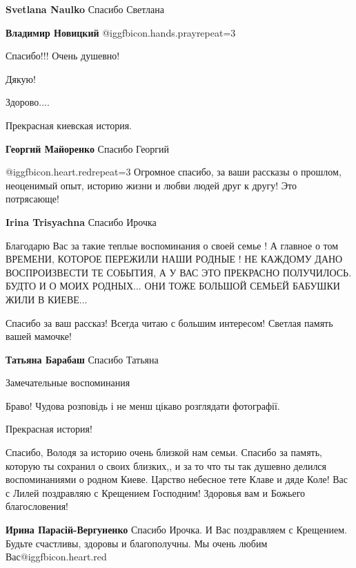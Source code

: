 \begin{itemize}
\begin{itemize} %
\textbf{Svetlana Naulko} Спасибо Светлана

\textbf{Владимир Новицкий}  @igg{fbicon.hands.pray}{repeat=3} 
\end{itemize} %

Спасибо!!!
Очень душевно!

Дякую!

Здорово....

Прекрасная киевская история.

\textbf{Георгий Майоренко} Спасибо Георгий

@igg{fbicon.heart.red}{repeat=3} Огромное спасибо, за ваши рассказы о прошлом, неоценимый опыт, историю жизни и любви людей друг к другу! Это потрясающе!

\textbf{Irina Trisyachna} Спасибо Ирочка


Благодарю Вас за такие теплые воспоминания о своей семье ! А главное о том
ВРЕМЕНИ, КОТОРОЕ ПЕРЕЖИЛИ НАШИ РОДНЫЕ ! НЕ КАЖДОМУ ДАНО ВОСПРОИЗВЕСТИ ТЕ
СОБЫТИЯ, А У ВАС ЭТО ПРЕКРАСНО ПОЛУЧИЛОСЬ. БУДТО И О МОИХ РОДНЫХ... ОНИ ТОЖЕ
БОЛЬШОЙ СЕМЬЕЙ БАБУШКИ ЖИЛИ В КИЕВЕ...

Спасибо за ваш рассказ! Всегда читаю с большим интересом! Светлая память вашей мамочке!

\textbf{Татьяна Барабаш} Спасибо Татьяна

Замечательные воспоминания

Браво!
Чудова розповідь і не менш цікаво розглядати фотографії.

Прекрасная история!


Спасибо, Володя за историю очень близкой нам семьи. Спасибо за память, которую
ты сохранил о своих близких,, и за то что ты так душевно делился воспоминаниями
о родном Киеве. Царство небесное тете Клаве и дяде Коле! Вас с Лилей поздравляю
с Крещением Господним! Здоровья вам и Божьего благословения!


\textbf{Ирина Парасій-Вергуненко} Спасибо Ирочка. И Вас поздравляем с Крещением. Будьте счастливы, здоровы и благополучны. Мы очень любим Вас@igg{fbicon.heart.red}


\end{itemize}
